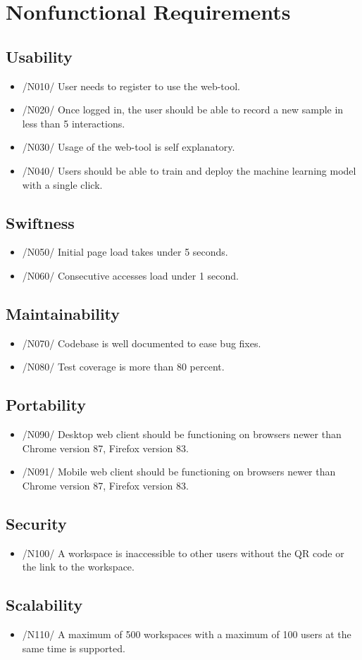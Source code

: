 \section{Nonfunctional Requirements}
\subsection{Usability}
\begin{itemize}
    \item /N010/ User needs to register to use the web-tool.
    \item /N020/ Once logged in, the user should be able to record a new sample in less than 5 interactions.
    \item /N030/ Usage of the web-tool is self explanatory.
    \item /N040/ Users should be able to train and deploy the machine learning model with a single click.
\end{itemize}
\subsection{Swiftness}
\begin{itemize}
    \item /N050/ Initial page load takes under 5 seconds.
    \item /N060/ Consecutive accesses load under 1 second.
\end{itemize}
\subsection{Maintainability}
\begin{itemize}
    \item /N070/ Codebase is well documented to ease bug fixes.
    \item /N080/ Test coverage is more than 80 percent.
\end{itemize}
\subsection{Portability}
\begin{itemize}
    \item /N090/ Desktop web client should be functioning on browsers newer than Chrome version 87, Firefox version 83.
    \item /N091/ Mobile web client should be functioning on browsers newer than Chrome version 87, Firefox version 83.
\end{itemize}
\subsection{Security}
\begin{itemize}
    \item /N100/ A workspace is inaccessible to other users without the QR code or the link to the workspace.
\end{itemize}
\subsection{Scalability}
\begin{itemize}
    \item /N110/ A maximum of 500 workspaces with a maximum of 100 users at the same time is supported. 
\end{itemize}
